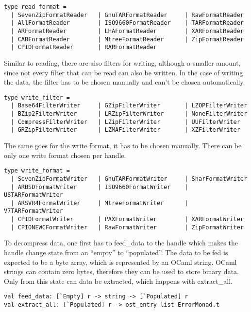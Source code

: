 \documentclass[parskip=half]{scrreprt}
\newcommand\inline[1]{{\addfontfeature{Letters=SmallCaps}#1}}
\begin{document}
\begin{verbatim}
type read_format =
  | SevenZipFormatReader   | GnuTARFormatReader     | RawFormatReader
  | AllFormatReader        | ISO9660FormatReader    | TARFormatReader
  | ARFormatReader         | LHAFormatReader        | XARFormatReader
  | CABFormatReader        | MtreeFormatReader      | ZipFormatReader
  | CPIOFormatReader       | RARFormatReader
\end{verbatim}

Similar to reading, there are also filters for writing, although a smaller
amount, since not every filter that can be read can also be written. In the
case of writing the data, the filter has to be chosen manually and can't be
chosen automatically.

\begin{verbatim}
type write_filter =
  | Base64FilterWriter     | GZipFilterWriter       | LZOPFilterWriter
  | BZip2FilterWriter      | LRZipFilterWriter      | NoneFilterWriter
  | CompressFilterWriter   | LZipFilterWriter       | UUFilterWriter
  | GRZipFilterWriter      | LZMAFilterWriter       | XZFilterWriter
\end{verbatim}

The same goes for the write format, it has to be chosen manually. There can
be only one write format chosen per handle.

\begin{verbatim}
type write_format =
  | SevenZipFormatWriter   | GnuTARFormatWriter     | SharFormatWriter
  | ARBSDFormatWriter      | ISO9660FormatWriter    | USTARFormatWriter
  | ARSVR4FormatWriter     | MtreeFormatWriter      | V7TARFormatWriter
  | CPIOFormatWriter       | PAXFormatWriter        | XARFormatWriter
  | CPIONEWCFormatWriter   | RawFormatWriter        | ZipFormatWriter
\end{verbatim}

To decompress data, one first has to \inline{feed\_data} to the handle which
makes the handle change state from an \enquote{empty} to \enquote{populated}.
The data to be fed is expected to be a byte array, which is represented by an
OCaml string. OCaml strings can contain zero bytes, therefore they can be used
to store binary data.  Only from this state can data be extracted, which
happens with \inline{extract\_all}.

\begin{verbatim}
val feed_data: [`Empty] r -> string -> [`Populated] r
val extract_all: [`Populated] r -> ost_entry list ErrorMonad.t
\end{verbatim}
\end{document}
